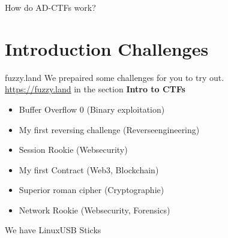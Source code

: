 \documentclass[12pt]{beamer}
\begin{document}
\begin{frame}{How do AD-CTFs work?}
{    }%

\end{frame}


\section{Introduction Challenges}
\begin{frame}{fuzzy.land}
    We prepaired some challenges for you to try out. \\
    \url{https://fuzzy.land} in the section {\bf Intro to CTFs}
    \begin{itemize}
        \item Buffer Overflow 0 (Binary exploitation)
        \item My first reversing challenge (Reverseengineering)
        \item Session Rookie (Websecurity)
        \item My first Contract (Web3, Blockchain)
        \item Superior roman cipher (Cryptographie)
        \item Network Rookie (Websecurity, Forensics)
    \end{itemize}
    We have Linux\-USB Sticks

\end{frame}
\end{document}
